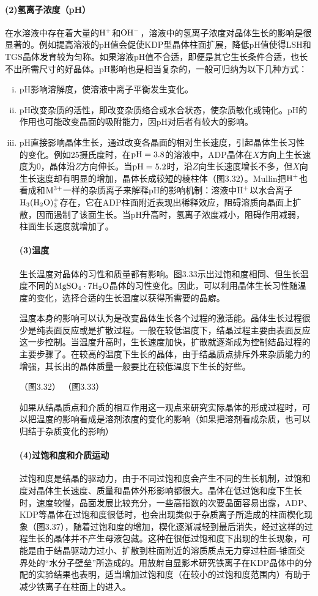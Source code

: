 \paragraph{(2)氢离子浓度（pH）}在水溶液中存在着大量的$\rm H^+$和$\rm OH^-$，溶液中的氢离子浓度对晶体生长的影响是很显著的。例如提高溶液的pH值会促使KDP型晶体柱面扩展，降低pH值使得LSH和TGS晶体发育较为匀称。如果溶液pH值不合适，即便是其它生长条件合适，也长不出所需尺寸的好晶体。pH影响也是相当复杂的，一般可归纳为以下几种方式：
\begin{enumerate}[(i)]\itemsep -0.5ex
\item pH影响溶解度，使溶液中离子平衡发生变化。
\item pH改变杂质的活性，即改变杂质络合或水合状态，使杂质敏化或钝化。pH的作用也可能改变晶面的吸附能力，因pH对后者有较大的影响。
\item pH直接影响晶体生长，通过改变各晶面的相对生长速度，引起晶体生长习性的变化。例如25摄氏度时，在$\rm pH=3.8$的溶液中，ADP晶体在$X$方向上生长速度为0，晶体沿$Z$方向伸长。当$\rm pH=5.2$时，沿$Z$向生长速度增长不多，但$X$向生长速度却有明显的增加，晶体长成较短的棱柱体（图3.32）。Mullin把$\rm H^+$也看成和$\rm M^{3+}$一样的杂质离子来解释pH的影响机制：溶液中$\rm H^+$以水合离子$\rm H_3(H_2O)_3^+$存在，它在ADP柱面附近表现出稀释效应，阻碍溶质向晶面上扩散，因而遏制了该面生长。当pH升高时，氢离子浓度减小，阻碍作用减弱，柱面生长速度就增加了。

\paragraph{(3)温度}生长温度对晶体的习性和质量都有影响。图3.33示出过饱和度相同、但生长温度不同的$\rm MgSO_4\cdot 7H_2O$晶体的习性变化。因此，可以利用晶体生长习性随温度的变化，选择合适的生长温度以获得所需要的晶癖。

温度本身的影响可以认为是改变晶体生长各个过程的激活能。晶体生长过程很少是纯表面反应或是扩散过程。一般在较低温度下，结晶过程主要由表面反应这一步控制。当温度升高时，生长速度加快，扩散就逐渐成为控制结晶过程的主要步骤了。在较高的温度下生长的晶体，由于结晶质点排斥外来杂质能力的增强，其长出的晶体质量一般要比在较低温度下生长的好些。

（图3.32）
（图3.33）

如果从结晶质点和介质的相互作用这一观点来研究实际晶体的形成过程时，可以把温度的影响看成是溶剂浓度的变化的影响（如果把溶剂看成杂质，也可以归结于杂质变化的影响）


\paragraph{(4)过饱和度和介质运动}过饱和度是结晶的驱动力，由于不同过饱和度会产生不同的生长机制，过饱和度对晶体生长速度、质量和晶体外形影响都很大。晶体在低过饱和度下生长时，速度较慢，晶面发展比较充分，一些高指数的次要晶面容易出露，ADP、KDP等晶体在过饱和度很低时，也会出现类似于杂质离子所造成的柱面楔化现象（图3.37），随着过饱和度的增加，楔化逐渐减轻到最后消失，经过这样的过程生长的晶体并不产生母液包藏。这种在很低过饱和度下出现的生长现象，可能是由于结晶驱动力过小、扩散到柱面附近的溶质质点无力穿过柱面-锥面交界处的“水分子壁垒”所造成的。用放射自显影术研究铁离子在KDP晶体中的分配的实验结果也表明，适当增加过饱和度（在较小的过饱和度范围内）有助于减少铁离子在柱面上的进入。


\end{enumerate}
